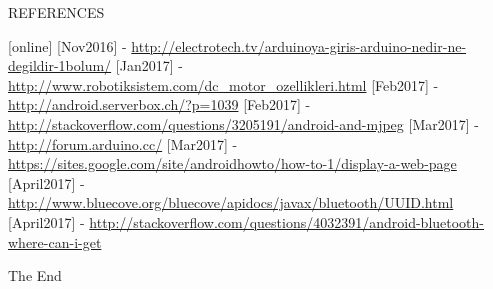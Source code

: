 \documentclass[xcolor=table, 9pt]{beamer}
\begin{document}


\begin{frame}{REFERENCES}
\begin{thebibliography}{9}
[online]
 {\scriptsize [Nov2016] - \url{http://electrotech.tv/arduinoya-giris-arduino-nedir-ne-degildir-1bolum/}}
 {\scriptsize [Jan2017] - \url{http://www.robotiksistem.com/dc_motor_ozellikleri.html}}
 {\scriptsize [Feb2017] - \url{http://android.serverbox.ch/?p=1039}}
 {\scriptsize [Feb2017] - \url{http://stackoverflow.com/questions/3205191/android-and-mjpeg}}
 {\scriptsize [Mar2017] - \url{http://forum.arduino.cc/}}
 {\scriptsize [Mar2017] - \url{https://sites.google.com/site/androidhowto/how-to-1/display-a-web-page}}
 {\scriptsize [April2017] - \url{http://www.bluecove.org/bluecove/apidocs/javax/bluetooth/UUID.html}}
 {\scriptsize [April2017] - \url{http://stackoverflow.com/questions/4032391/android-bluetooth-where-can-i-get}}








\end{thebibliography}
\end{frame}




\begin{frame}
\Huge{\centerline{The End}}
\end{frame}
\end{document}
